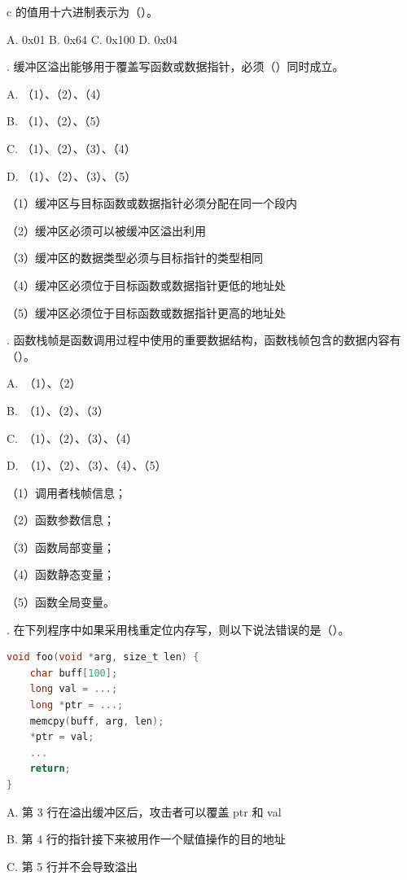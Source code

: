 \documentclass[UTF8]{ctexart}
\begin{document}
\noindent
c 的值用十六进制表示为（\quad）。

\noindent
A. 0x01 \quad
B. 0x64 \quad
C. 0x100 \quad
D. 0x04

. 缓冲区溢出能够用于覆盖写函数或数据指针，必须（\quad）同时成立。

\noindent
A. （1）、（2）、（4）

\noindent
B. （1）、（2）、（5）

\noindent
C. （1）、（2）、（3）、（4）

\noindent
D. （1）、（2）、（3）、（5）

\noindent
（1）缓冲区与目标函数或数据指针必须分配在同一个段内

\noindent
（2）缓冲区必须可以被缓冲区溢出利用

\noindent
（3）缓冲区的数据类型必须与目标指针的类型相同

\noindent
（4）缓冲区必须位于目标函数或数据指针更低的地址处

\noindent
（5）缓冲区必须位于目标函数或数据指针更高的地址处


. 函数栈帧是函数调用过程中使用的重要数据结构，函数栈帧包含的数据内容有（\quad）。

\noindent
A.\ （1）、（2）

\noindent
B.\ （1）、（2）、（3）

\noindent
C.\ （1）、（2）、（3）、（4）

\noindent
D.\ （1）、（2）、（3）、（4）、（5）

\noindent
（1）调用者栈帧信息；

\noindent
（2）函数参数信息；

\noindent
（3）函数局部变量；

\noindent
（4）函数静态变量；

\noindent
（5）函数全局变量。

. 在下列程序中如果采用栈重定位内存写，则以下说法错误的是（\quad）。

\begin{lstlisting}[language=C]
void foo(void *arg, size_t len) {
    char buff[100];
    long val = ...;
    long *ptr = ...;
    memcpy(buff, arg, len);
    *ptr = val;
    ...
    return;
}
\end{lstlisting}

\noindent
A. 第 3 行在溢出缓冲区后，攻击者可以覆盖 ptr 和 val

\noindent
B. 第 4 行的指针接下来被用作一个赋值操作的目的地址

\noindent
C. 第 5 行并不会导致溢出
\end{document}
